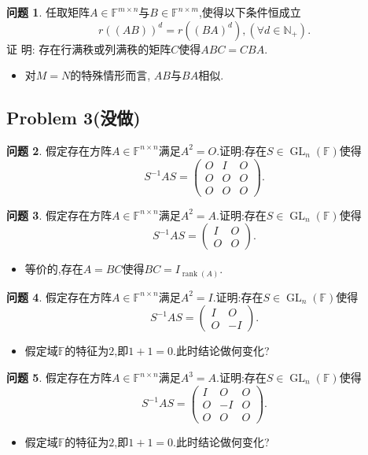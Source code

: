 \documentclass[11pt]{ctexart}
\theoremstyle{definition}
\newtheorem{qqq}{问题}[section]
\numberwithin{equation}{section}
\begin{document}
\begin{qqq}
    任取矩阵$A \in \mathbb{F}^{m\times n}$与$B\in \mathbb{F}^{n\times m}$,使得以下条件恒成立$$r((AB))^d=r((BA)^d),(\forall d \in \mathbb{N}_+).$$
    证
    明: 存在行满秩或列满秩的矩阵$C$使得$ABC=CBA$.
    \begin{itemize}
        \item 对$M=N$的特殊情形而言,  $AB$与$BA$相似.
    \end{itemize}
\end{qqq}

\subsection{Problem 3(没做)}
\begin{qqq}
    假定存在方阵$A\in \mathbb{F}^{n\times n}$满足$A^2=O$.证明:存在$S\in \operatorname{GL}_n(\mathbb{F})$使得$$
    S^{-1}AS=\begin{pmatrix}
        O&I&O\\O&O&O\\O&O&O
    \end{pmatrix}.$$
\end{qqq}

\begin{qqq}
    假定存在方阵$A\in \mathbb{F}^{n\times n}$满足$A^2=A$.证明:存在$S\in \operatorname{GL}_n(\mathbb{F})$使得$$
    S^{-1}AS=\begin{pmatrix}
        I&O\\O&O
    \end{pmatrix}.$$
    \begin{itemize}
        \item 等价的,存在$A=BC$使得$BC=I_{\operatorname{rank}(A)}.$
    \end{itemize}
\end{qqq}

\begin{qqq}
    假定存在方阵$A\in \mathbb{F}^{n\times n}$满足$A^2=I$.证明:存在$S\in \operatorname{GL}_n(\mathbb{F})$使得$$
    S^{-1}AS=\begin{pmatrix}
        I&O\\O&-I
    \end{pmatrix}.$$
    \begin{itemize}
        \item 假定域$\mathbb{F}$的特征为$2$,即$1+1=0.$此时结论做何变化?
    \end{itemize}
\end{qqq}

\begin{qqq}
    假定存在方阵$A\in \mathbb{F}^{n\times n}$满足$A^3=A$.证明:存在$S\in \operatorname{GL}_n(\mathbb{F})$使得$$
    S^{-1}AS=\begin{pmatrix}
        I&O&O\\O&-I&O\\O&O&O
    \end{pmatrix}.$$
    \begin{itemize}
        \item 假定域$\mathbb{F}$的特征为$2$,即$1+1=0.$此时结论做何变化?
    \end{itemize}
\end{qqq}
\end{document}
